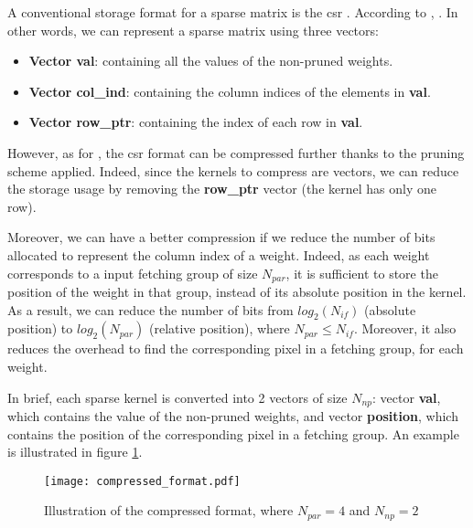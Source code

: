 A conventional storage format for a sparse matrix is the \acrfull{csr} \cite{buluc_parallel_2009}. According to \textcite{buluc_parallel_2009}, . In other words, we can represent a sparse matrix using three vectors:
%
\begin{itemize}
    \item \textbf{Vector val}: containing all the values of the non-pruned weights.
    \item \textbf{Vector col\_ind}: containing the column indices of the elements in \textbf{val}.
    \item \textbf{Vector row\_ptr}: containing the index of each row in \textbf{val}.
\end{itemize}
%
However, as for \cite{zhu_efficient_2020}, the \acrshort{csr} format can be compressed further thanks to the pruning scheme applied. Indeed, since the kernels to compress are vectors, we can reduce the storage usage by removing the \textbf{row\_ptr} vector (the kernel has only one row). 

Moreover, we can have a better compression if we reduce the number of bits allocated to represent the column index of a weight. Indeed, as each weight corresponds to a input fetching group of size $N_{par}$, it is sufficient to store the position of the weight in that group, instead of its absolute position in the kernel. As a result, we can reduce the number of bits from $log_2(N_{if})$ (absolute position) to $log_2(N_{par})$ (relative position), where $N_{par} \leq N_{if}$. Moreover, it also reduces the overhead to find the corresponding pixel in a fetching group, for each weight.

In brief, each sparse kernel is converted into 2 vectors of size $N_{np}$: vector \textbf{val}, which contains the value of the non-pruned weights, and vector \textbf{position}, which contains the position of the corresponding pixel in a fetching group. An example is illustrated in figure \ref{fig:compressed_format}.
%
\begin{figure}[H]
    \centering
    \texttt{[image: compressed\_format.pdf]}
    \caption{Illustration of the compressed format, where $N_{par} = 4$ and $N_{np} = 2$}
    \label{fig:compressed_format}
\end{figure}

